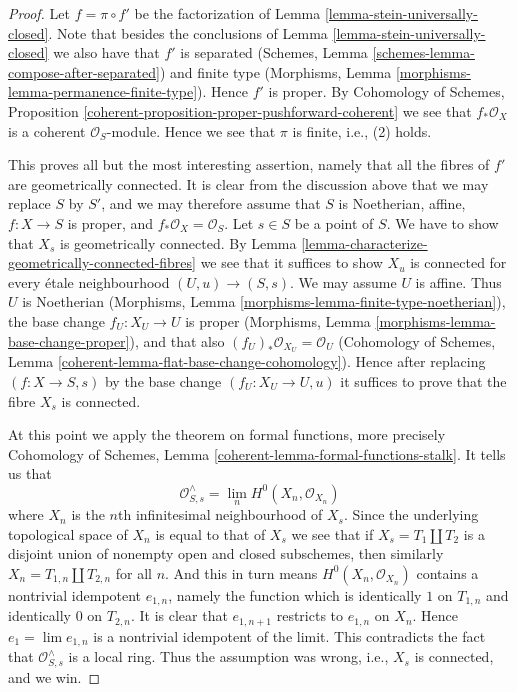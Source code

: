 \begin{proof}
Let $f = \pi \circ f'$ be the factorization of
Lemma \ref{lemma-stein-universally-closed}. Note that besides the
conclusions of Lemma \ref{lemma-stein-universally-closed} we
also have that $f'$ is separated
(Schemes, Lemma \ref{schemes-lemma-compose-after-separated})
and finite type
(Morphisms, Lemma \ref{morphisms-lemma-permanence-finite-type}).
Hence $f'$ is proper. By
Cohomology of Schemes, Proposition
\ref{coherent-proposition-proper-pushforward-coherent}
we see that $f_*\mathcal{O}_X$ is a coherent $\mathcal{O}_S$-module.
Hence we see that $\pi$ is finite, i.e., (2) holds.

\medskip\noindent
This proves all but the most interesting assertion, namely that
all the fibres of $f'$ are geometrically connected.
It is clear from the discussion above that we may replace $S$ by $S'$,
and we may therefore assume that $S$ is Noetherian, affine,
$f : X \to S$ is proper, and $f_*\mathcal{O}_X = \mathcal{O}_S$.
Let $s \in S$ be a point of $S$. We have to show that $X_s$ is
geometrically connected. By Lemma
\ref{lemma-characterize-geometrically-connected-fibres}
we see that it suffices to show $X_u$ is connected
for every \'etale neighbourhood $(U, u) \to (S, s)$.
We may assume $U$ is affine. Thus $U$ is Noetherian
(Morphisms, Lemma \ref{morphisms-lemma-finite-type-noetherian}),
the base change $f_U : X_U \to U$ is proper
(Morphisms, Lemma \ref{morphisms-lemma-base-change-proper}),
and that also $(f_U)_*\mathcal{O}_{X_U} = \mathcal{O}_U$
(Cohomology of Schemes, Lemma \ref{coherent-lemma-flat-base-change-cohomology}).
Hence after replacing
$(f : X \to S, s)$ by the base change $(f_U : X_U \to U, u)$
it suffices to prove that the fibre $X_s$ is connected.

\medskip\noindent
At this point we apply the theorem on formal functions,
more precisely Cohomology of Schemes, Lemma
\ref{coherent-lemma-formal-functions-stalk}.
It tells us that
$$
\mathcal{O}^\wedge_{S, s} =
\lim_n H^0(X_n, \mathcal{O}_{X_n})
$$
where $X_n$ is the $n$th infinitesimal neighbourhood of $X_s$.
Since the underlying topological space of $X_n$ is equal to that
of $X_s$ we see that if $X_s = T_1 \amalg T_2$ is a disjoint union
of nonempty open and closed subschemes, then similarly
$X_n = T_{1, n} \amalg T_{2, n}$ for all $n$. And this in turn means
$H^0(X_n, \mathcal{O}_{X_n})$ contains a nontrivial idempotent $e_{1, n}$,
namely the function which is identically $1$ on $T_{1, n}$ and
identically $0$ on $T_{2, n}$. It is clear that $e_{1, n + 1}$
restricts to $e_{1, n}$ on $X_n$. Hence $e_1 = \lim e_{1, n}$
is a nontrivial idempotent of the limit. This contradicts the fact
that $\mathcal{O}^\wedge_{S, s}$ is a local ring. Thus the
assumption was wrong, i.e., $X_s$ is connected, and we win.
\end{proof}

